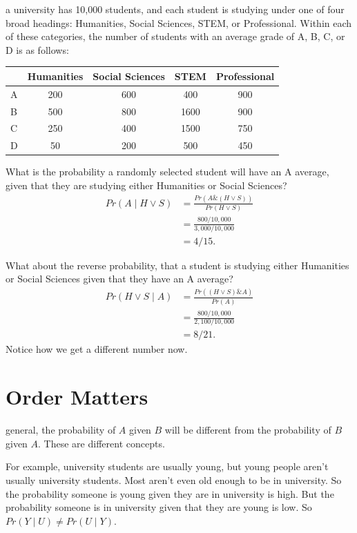 \documentclass[justified]{tufte-book}
\newcommand{\given}{\mid}
\renewcommand{\wedge}{\mathbin{\&}}
\newcommand{\p}{Pr}
\theoremstyle{definition}
\theoremstyle{definition}
\theoremstyle{definition}
\theoremstyle{remark}
\begin{document}
 a university has 10,000 students, and each student is studying under one of four broad headings: Humanities, Social Sciences, STEM, or Professional. Within each of these categories, the number of students with an average grade of A, B, C, or D is as follows:

\begin{longtable}[]{@{}lcccc@{}}
\toprule
& Humanities & Social Sciences & STEM & Professional\tabularnewline
\midrule
\endhead
A & 200 & 600 & 400 & 900\tabularnewline
B & 500 & 800 & 1600 & 900\tabularnewline
C & 250 & 400 & 1500 & 750\tabularnewline
D & 50 & 200 & 500 & 450\tabularnewline
\bottomrule
\end{longtable}

What is the probability a randomly selected student will have an A average, given that they are studying either Humanities or Social Sciences?
\[
  \begin{aligned}
    \p(A \given H \vee S) &= \frac{\p(A \wedge (H \vee S))}{\p(H \vee S)}\\
                           &= \frac{800/10,000}{3,000/10,000}\\
                           &= 4/15.
  \end{aligned}
\]

What about the reverse probability, that a student is studying either Humanities or Social Sciences given that they have an A average?
\[
  \begin{aligned}
    \p(H \vee S \given A) &= \frac{\p((H \vee S) \wedge A)}{\p(A)}\\
                           &= \frac{800/10,000}{2,100/10,000}\\
                           &= 8/21.
  \end{aligned}
\]
Notice how we get a different number now.

\hypertarget{order-matters}{%
\section{Order Matters}\label{order-matters}}

 general, the probability of \(A\) given \(B\) will be different from the probability of \(B\) given \(A\). These are different concepts.

For example, university students are usually young, but young people aren't usually university students. Most aren't even old enough to be in university. So the probability someone is young given they are in university is high. But the probability someone is in university given that they are young is low. So \(\p(Y \given U) \neq \p(U \given Y)\).
\end{document}

